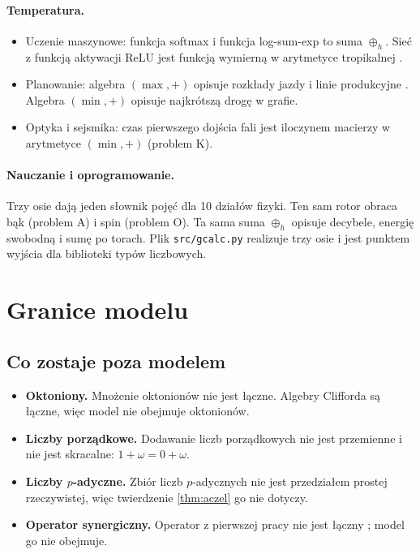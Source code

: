 \documentclass[11pt,a4paper]{article}
\newcommand{\oph}{\mathbin{\oplus_{h}}}       %
\begin{document}
\paragraph{Temperatura.}
\begin{itemize}[leftmargin=1.6em]
  \item Uczenie maszynowe: funkcja softmax i funkcja log-sum-exp to suma
        $\oph$. Sieć z funkcją aktywacji ReLU jest funkcją wymierną
        w arytmetyce tropikalnej \cite{zhang2018}.
  \item Planowanie: algebra $(\max,+)$ opisuje rozkłady jazdy i linie
        produkcyjne \cite{baccelli1992}. Algebra $(\min,+)$ opisuje najkrótszą
        drogę w grafie.
  \item Optyka i sejsmika: czas pierwszego dojścia fali jest iloczynem
        macierzy w arytmetyce $(\min,+)$ (problem K).
\end{itemize}

\paragraph{Nauczanie i oprogramowanie.}
Trzy osie dają jeden słownik pojęć dla 10 działów fizyki. Ten sam rotor obraca
bąk (problem A) i spin (problem O). Ta sama suma $\oph$ opisuje decybele,
energię swobodną i sumę po torach. Plik \texttt{src/gcalc.py} realizuje trzy
osie i jest punktem wyjścia dla biblioteki typów liczbowych.

\section{Granice modelu}
\label{sec:limits}

\subsection{Co zostaje poza modelem}

\begin{itemize}[leftmargin=1.6em]
  \item \textbf{Oktoniony.} Mnożenie oktonionów nie jest łączne. Algebry
        Clifforda są łączne, więc model nie obejmuje oktonionów.
  \item \textbf{Liczby porządkowe.} Dodawanie liczb porządkowych nie jest
        przemienne i nie jest skracalne: $1+\omega=0+\omega$.
  \item \textbf{Liczby $p$-adyczne.} Zbiór liczb $p$-adycznych nie jest
        przedziałem prostej rzeczywistej, więc twierdzenie \ref{thm:aczel} go
        nie dotyczy.
  \item \textbf{Operator synergiczny.} Operator z pierwszej pracy nie jest
        łączny \cite{szulia2026}; model go nie obejmuje.
\end{itemize}
\end{document}
